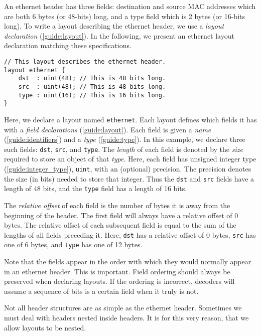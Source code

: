 An ethernet header has three fields: destination and source MAC addresses which
are both 6 bytes (or 48-bits) long, and a type field which is 2 bytes (or
16-bits long). To write a layout describing the ethernet header, we use a
\textit{layout declaration} (\ref{guide:layout}). In the following, we present
an ethernet layout declaration matching these specifications.

\begin{codepage}
\begin{lstlisting}
// This layout describes the ethernet header.
layout ethernet {
	dst  : uint(48); // This is 48 bits long.
	src  : uint(48); // This is 48 bits long.
	type : uint(16); // This is 16 bits long.
}
\end{lstlisting}
\end{codepage}

Here, we declare a layout named \texttt{ethernet}. Each layout defines which
fields it has with a \textit{field declarations} (\ref{guide:layout}). Each
field is given a \textit{name} (\ref{guide:identifiers}) and a \textit{type}
(\ref{guide:type}). In this example, we declare three such fields: \texttt{dst},
\texttt{src}, and \texttt{type}. The \textit{length} of each field is denoted by
the \textit{size} required to store an object of that \textit{type}. Here, each
field has unsigned integer type (\ref{guide:integer_type}), \texttt{uint}, with
an (optional) precision. The precision denotes the size (in bits) needed to
store that integer. Thus the \texttt{dst} and \texttt{src} fields have a length
of 48 bits, and the \texttt{type} field has a length of 16 bits.

The \textit{relative offset} of each field is the number of bytes it is away
from the beginning of the header. The first field will always have a relative
offset of 0 bytes. The relative offset of each subsequent field is equal to the
sum of the lengths of all fields preceding it. Here, \texttt{dst} has a relative
offset of 0 bytes, \texttt{src} has one of 6 bytes, and \texttt{type} has one of
12 bytes.

Note that the fields appear in the order with which they would normally appear
in an ethernet header. This is important. Field ordering should always be
preserved when declaring layouts. If the ordering is incorrect, decoders will
assume a sequence of bits is a certain field when it truly is not.

Not all header structures are as simple as the ethernet header. Sometimes we
must deal with headers nested inside headers. It is for this very reason, that
we allow layouts to be nested.

